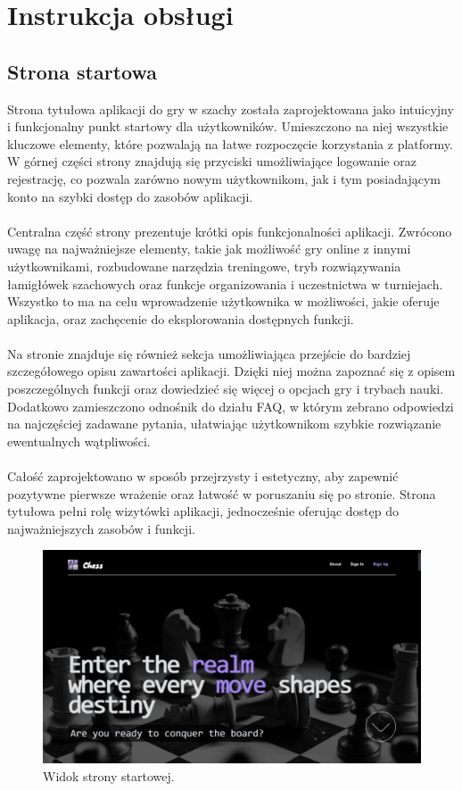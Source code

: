 \documentclass[12pt,a4paper]{article}
\begin{document}
\newpage
\section{Instrukcja obsługi}

\subsection{Strona startowa}
Strona tytułowa aplikacji do gry w szachy została zaprojektowana jako intuicyjny i funkcjonalny punkt startowy dla użytkowników. Umieszczono na niej wszystkie kluczowe elementy, które pozwalają na łatwe rozpoczęcie korzystania z platformy. W górnej części strony znajdują się przyciski umożliwiające logowanie oraz rejestrację, co pozwala zarówno nowym użytkownikom, jak i tym posiadającym konto na szybki dostęp do zasobów aplikacji.
\\\\
Centralna część strony prezentuje krótki opis funkcjonalności aplikacji. Zwrócono uwagę na najważniejsze elementy, takie jak możliwość gry online z innymi użytkownikami, rozbudowane narzędzia treningowe, tryb rozwiązywania łamigłówek szachowych oraz funkcje organizowania i uczestnictwa w turniejach. Wszystko to ma na celu wprowadzenie użytkownika w możliwości, jakie oferuje aplikacja, oraz zachęcenie do eksplorowania dostępnych funkcji.
\\\\
Na stronie znajduje się również sekcja umożliwiająca przejście do bardziej szczegółowego opisu zawartości aplikacji. Dzięki niej można zapoznać się z opisem poszczególnych funkcji oraz dowiedzieć się więcej o opcjach gry i trybach nauki. Dodatkowo zamieszczono odnośnik do działu FAQ, w którym zebrano odpowiedzi na najczęściej zadawane pytania, ułatwiając użytkownikom szybkie rozwiązanie ewentualnych wątpliwości.
\\\\
Całość zaprojektowano w sposób przejrzysty i estetyczny, aby zapewnić pozytywne pierwsze wrażenie oraz łatwość w poruszaniu się po stronie. Strona tytułowa pełni rolę wizytówki aplikacji, jednocześnie oferując dostęp do najważniejszych zasobów i funkcji.

\begin{figure}[h!]
    \centering
    \includegraphics[width=1\textwidth]{zdj/ins_hero.png}
    \caption{Widok strony startowej.}
\end{figure}
\end{document}
